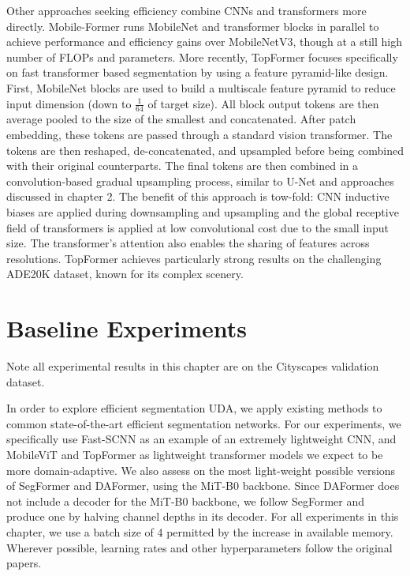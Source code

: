 \documentclass[a4paper,12pt]{report}
\begin{document}
Other approaches seeking efficiency combine CNNs and transformers more directly. Mobile-Former \cite{chen_mobile-former_2022} runs MobileNet and transformer blocks in parallel to achieve performance and efficiency gains over MobileNetV3, though at a still high number of FLOPs and parameters. More recently, TopFormer \cite{zhang_topformer_2022} focuses specifically on fast transformer based segmentation by using a feature pyramid-like design. First, MobileNet blocks are used to build a multiscale feature pyramid to reduce input dimension (down to $\frac{1}{64}$ of target size). All block output tokens are then average pooled to the size of the smallest and concatenated. After patch embedding, these tokens are passed through a standard vision transformer. The tokens are then reshaped, de-concatenated, and upsampled before being combined with their original counterparts. The final tokens are then combined in a convolution-based gradual upsampling process, similar to U-Net \cite{ronneberger_u-net_2015} and approaches discussed in chapter 2. The benefit of this approach is tow-fold: CNN inductive biases are applied during downsampling and upsampling and the global receptive field of transformers is applied at low convolutional cost due to the small input size. The transformer's attention also enables the sharing of features across resolutions. TopFormer achieves particularly strong results on the challenging ADE20K dataset, known for its complex scenery.



\section{Baseline Experiments}
Note all experimental results in this chapter are on the Cityscapes validation dataset.

In order to explore efficient segmentation UDA, we apply existing methods to common state-of-the-art efficient segmentation networks. For our experiments, we specifically use Fast-SCNN \cite{poudel_fast-scnn_2019} as an example of an extremely lightweight CNN, and MobileViT \cite{mehta_mobilevit_2022} and TopFormer \cite{zhang_topformer_2022} as lightweight transformer models we expect to be more domain-adaptive. We also assess on the most light-weight possible versions of SegFormer and DAFormer, using the MiT-B0 backbone. Since DAFormer does not include a decoder for the MiT-B0 backbone, we follow SegFormer and produce one by halving channel depths in its decoder. For all experiments in this chapter, we use a batch size of 4 permitted by the increase in available memory. Wherever possible, learning rates and other hyperparameters follow the original papers.
\end{document}

